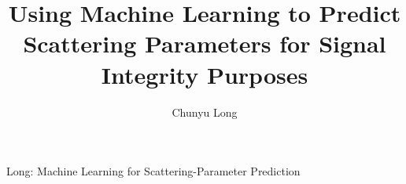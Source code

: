 \documentclass[a4paper,journal]{IEEEtran}
\begin{document}
\title{Using Machine Learning to Predict Scattering Parameters for Signal
Integrity Purposes}

\author{Chunyu Long}

%
{Long: Machine Learning for Scattering-Parameter Prediction}

\maketitle











\end{document}
